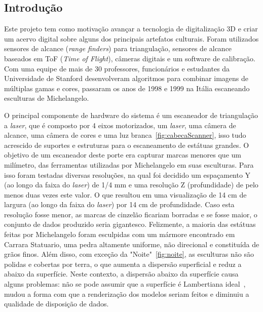 \subsection*{Introdução}

Este projeto tem como motivação avançar a tecnologia de digitalização 3D e criar um acervo digital sobre alguns dos principais artefatos culturais. Foram utilizados sensores de alcance (\emph{range finders}) para triangulação, sensores de alcance baseados em ToF (\emph{Time of Flight}), câmeras digitais e um software de calibração. Com uma equipe de mais de 30 professores, funcionários e estudantes da Universidade de Stanford desenvolveram algoritmos para combinar imagens de múltiplas gamas e cores, passaram os anos de 1998 e 1999 na Itália escaneando esculturas de Michelangelo. 

O principal componente de hardware do sistema é um escaneador de triangulação a \emph{laser}, que é composto por 4 eixos motorizados, um \emph{laser}, uma câmera de alcance, uma câmera de cores e uma luz branca~\ref{fig:cabecaScanner}, isso tudo acrescido de suportes e estruturas para o escaneamento de estátuas grandes. O objetivo de um escaneador deste porte era capturar marcas menores que um milímetro, das ferramentas utilizadas por Michelangelo em suas esculturas. 
Para isso foram testadas diversas resoluções, na qual foi decidido um espaçamento Y (ao longo da faixa do \emph{laser}) de 1/4 mm e uma resolução Z (profundidade) de pelo menos duas vezes este valor. 
O que resultou em uma visualização de 14 cm de largura (ao longo da faixa do \emph{laser}) por 14 cm de profundidade. Caso esta resolução fosse menor, as marcas de cinzelão ficariam borradas e se fosse maior, o conjunto de dados produzido seria gigantesco.
Felizmente, a maioria das estátuas feitas por Michelangelo foram esculpidas com um mármore encontrado em Carrara Statuario, uma pedra altamente uniforme, não direcional e constituída de grãos finos. Além disso, com exceção da "Noite"~\ref{fig:noite}, as esculturas não são polidas e cobertas por terra, o que aumenta a dispersão superficial e reduz a abaixo da superfície.
Neste contexto, a dispersão abaixo da superfície causa alguns problemas: não se pode assumir que a superfície é Lambertiana ideal~\cite{basri2003lambertian}, mudou a forma com que a renderização dos modelos seriam feitos e diminuiu a qualidade de disposição de dados.

